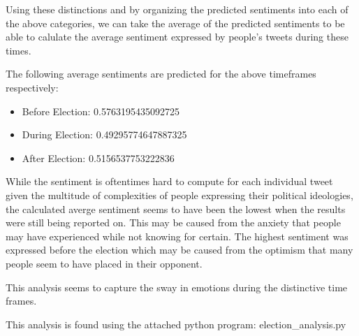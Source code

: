 \documentclass{article}
\begin{document}
\noindent Using these distinctions and by organizing the predicted sentiments into each of the above categories, we can take the average of the predicted sentiments to be able to calulate the average sentiment expressed by people's tweets during these times. 

\noindent The following average sentiments are predicted for the above timeframes respectively: 

\begin{itemize}
    \item Before Election: 0.5763195435092725
    \item During Election: 0.49295774647887325
    \item After Election: 0.5156537753222836
\end{itemize}

\noindent While the sentiment is oftentimes hard to compute for each individual tweet given the multitude of complexities of people expressing their political ideologies, the calculated averge sentiment seems to have been the lowest when the results were still being reported on. This may be caused from the anxiety that people may have experienced while not knowing for certain. The highest sentiment was expressed before the election which may be caused from the optimism that many people seem to have placed in their opponent. 

\noindent This analysis seems to capture the sway in emotions during the distinctive time frames. 

\noident This analysis is found using the attached python program: election\_analysis.py



\end{document}
